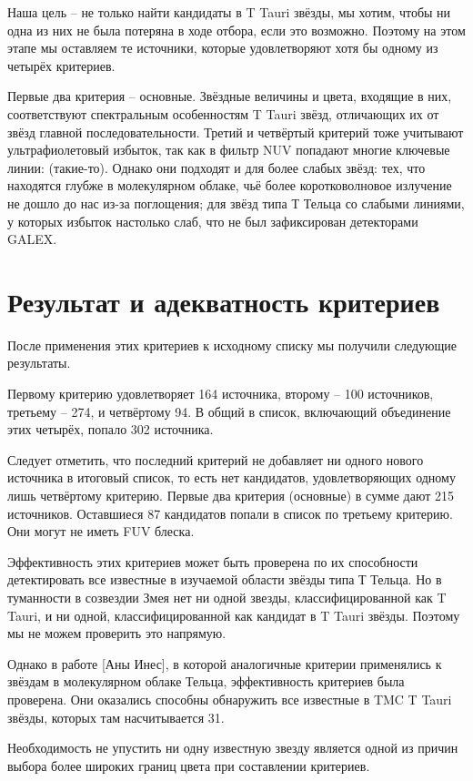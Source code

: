 Наша цель -- не только найти кандидаты в T Tauri звёзды, мы хотим, чтобы ни одна из них не была потеряна в ходе отбора, если это возможно. Поэтому на этом этапе мы оставляем те источники, которые удовлетворяют хотя бы одному из четырёх критериев.

Первые два критерия -- основные. Звёздные величины и цвета, входящие в них, соответствуют спектральным особенностям T Tauri звёзд, отличающих их от звёзд главной последовательности. Третий и четвёртый критерий тоже учитывают ультрафиолетовый избыток, так как в фильтр NUV попадают многие ключевые линии: (такие-то). Однако они подходят и для более слабых звёзд: тех, что находятся глубже в молекулярном облаке, чьё более коротковолновое излучение не дошло до нас из-за поглощения; для звёзд типа Т Тельца со слабыми линиями, у которых избыток настолько слаб, что не был зафиксирован детекторами GALEX.

\section{Результат и адекватность критериев}
После применения этих критериев к исходному списку мы получили следующие результаты.

Первому критерию удовлетворяет 164 источника, второму -- 100 источников, третьему -- 274, и четвёртому 94. В общий в список, включающий объединение этих четырёх, попало 302 источника.

Следует отметить, что последний критерий не добавляет ни одного нового источника в итоговый список, то есть нет кандидатов, удовлетворяющих одному лишь четвёртому критерию. Первые два критерия (основные) в сумме дают 215 источников. Оставшиеся 87 кандидатов попали в список по третьему критерию. Они могут не иметь FUV блеска.

Эффективность этих критериев может быть проверена по их способности детектировать все известные в изучаемой области звёзды типа Т Тельца. Но в туманности в созвездии Змея нет ни одной звезды, классифицированной как T Tauri, и ни одной, классифицированной как кандидат в T Tauri звёзды. Поэтому мы не можем проверить это напрямую.

Однако в работе [Аны Инес], в которой аналогичные критерии применялись к звёздам в молекулярном облаке Тельца, эффективность критериев была проверена. Они оказались способны обнаружить все известные в TMC T Tauri звёзды, которых там насчитывается 31. 

Необходимость не упустить ни одну известную  звезду является одной из причин выбора более широких границ цвета при составлении критериев.

